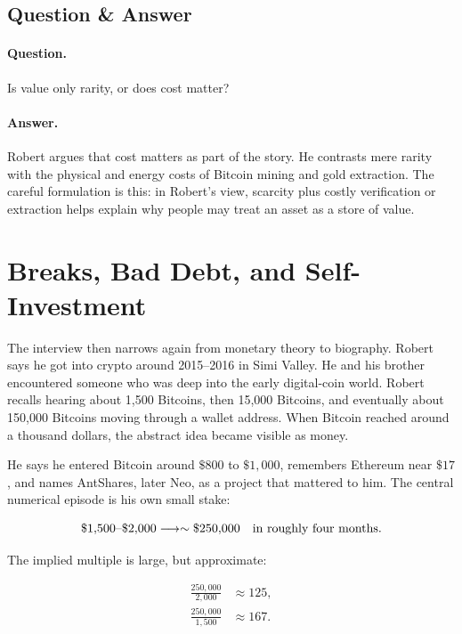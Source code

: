 \subsection{Question \& Answer}

\paragraph{Question.} Is value only rarity, or does cost matter?

\paragraph{Answer.} Robert argues that cost matters as part of the story. He contrasts mere rarity with the physical and energy costs of Bitcoin mining and gold extraction. The careful formulation is this: in Robert's view, scarcity plus costly verification or extraction helps explain why people may treat an asset as a store of value.

\section{Breaks, Bad Debt, and Self-Investment}

The interview then narrows again from monetary theory to biography. Robert says he got into crypto around 2015--2016 in Simi Valley. He and his brother encountered someone who was deep into the early digital-coin world. Robert recalls hearing about 1,500 Bitcoins, then 15,000 Bitcoins, and eventually about 150,000 Bitcoins moving through a wallet address. When Bitcoin reached around a thousand dollars, the abstract idea became visible as money.

He says he entered Bitcoin around \( \$800 \) to \( \$1{,}000 \), remembers Ethereum near \( \$17 \), and names AntShares, later Neo, as a project that mattered to him. The central numerical episode is his own small stake:

\begin{equation}
\$1{,}500\hbox{--}\$2{,}000
\longrightarrow
\sim \$250{,}000
\quad
\hbox{in roughly four months.}
\end{equation}

The implied multiple is large, but approximate:

\begin{align}
\frac{250{,}000}{2{,}000} &\approx 125, \\
\frac{250{,}000}{1{,}500} &\approx 167.
\end{align}

